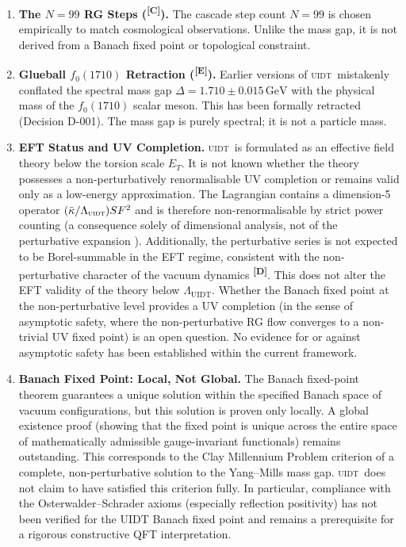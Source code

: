 \documentclass[12pt,a4paper,twoside]{article}
\theoremstyle{plain}
\theoremstyle{definition}
\theoremstyle{remark}
\newcommand{\UIDT}{\textsc{uidt}}
\newcommand{\GeV}{\,\mathrm{GeV}}
\newcommand{\catmark}[1]{\textsuperscript{\textsf{\textbf{[#1]}}}}
\newcommand{\DeltaGap}{1.710 \pm 0.015\GeV}        %
\begin{document}
\begin{enumerate}[label=\textbf{L\arabic*:}, leftmargin=*]
  \item \textbf{The $N=99$ RG Steps (\catmark{C}).}
    The cascade step count $N=99$ is chosen empirically to match cosmological
    observations. Unlike the mass gap, it is not derived from a Banach fixed
    point or topological constraint.

  \item \textbf{Glueball $f_0(1710)$ Retraction (\catmark{E}).}
    Earlier versions of \UIDT\ mistakenly conflated the spectral mass gap
    $\Delta = \DeltaGap$ with the physical mass of the $f_0(1710)$ scalar
    meson. This has been formally retracted (Decision D-001). The mass gap
    is purely spectral; it is not a particle mass.
\clearpage
  \item \textbf{EFT Status and UV Completion.}
    \UIDT\ is formulated as an effective field theory below the torsion scale
    $E_T$. It is not known whether the theory possesses a non-perturbatively
    renormalisable UV completion or remains valid only as a low-energy
    approximation. The Lagrangian contains a dimension-5 operator
    $(\bar{\kappa}/\Lambda_{\UIDT})S F^2$
    and is therefore non-renormalisable by strict power counting (a consequence
    solely of dimensional analysis, not of the perturbative expansion
    \cite{Weinberg1995}).
    Additionally, the perturbative series is not expected to be Borel-summable
    in the EFT regime, consistent with the non-perturbative character of the
    vacuum dynamics \catmark{D}. This does not alter the EFT validity of the
    theory below $\Lambda_{\mathrm{UIDT}}$. Whether the Banach fixed point at the non-perturbative level
    provides a UV completion (in the sense of asymptotic safety, where the
    non-perturbative RG flow converges to a non-trivial UV fixed point) is
    an open question. No evidence for or against asymptotic safety has been
    established within the current framework.

  \item \textbf{Banach Fixed Point: Local, Not Global.}
    The Banach fixed-point theorem guarantees a unique solution within the
    specified Banach space of vacuum configurations, but this solution is
    proven only locally. A global existence proof (showing that the fixed
    point is unique across the entire space of mathematically admissible
    gauge-invariant functionals) remains outstanding. This corresponds to
    the Clay Millennium Problem criterion of a complete, non-perturbative
    solution to the Yang--Mills mass gap. \UIDT\ does not claim to have
    satisfied this criterion fully. In particular, compliance with the
    Osterwalder--Schrader axioms (especially reflection positivity) has not
    been verified for the UIDT Banach fixed point and remains a prerequisite
    for a rigorous constructive QFT interpretation.


\end{enumerate}
\end{document}
